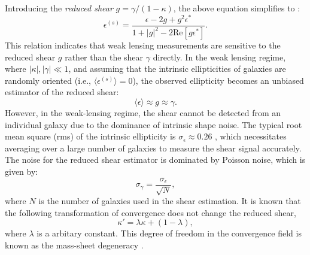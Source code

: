 Introducing the \emph{reduced shear} $g = \gamma / (1 - \kappa)$, the above equation simplifies to \citep{1995A&A...294..411S}:
\begin{equation}
    \epsilon^{(s)} = \frac{\epsilon - 2g + g^2 \epsilon^*}{1 + |g|^2 - 2 \text{Re}[g \epsilon^*]}.
    \label{eq:reduced_shear_ellipticity_g}
\end{equation}
This relation indicates that weak lensing measurements are sensitive to the reduced shear $g$ rather than the shear $\gamma$ directly. In the weak lensing regime, where $|\kappa|, |\gamma| \ll 1$, and assuming that the intrinsic ellipticities of galaxies are randomly oriented (i.e., $\langle \epsilon^{(s)} \rangle = 0$), the observed ellipticity becomes an unbiased estimator of the reduced shear:
\begin{equation}
    \langle \epsilon \rangle \approx g \approx \gamma.
    \label{eq:reduced_shear_expectation}
\end{equation}
However, in the weak-lensing regime, the shear cannot be detected from an individual galaxy due to the dominance of intrinsic shape noise. The typical root mean square (rms) of the intrinsic ellipticity is $\sigma_\epsilon \approx 0.26$ \citep{2019A&A...627A..59E}, which necessitates averaging over a large number of galaxies to measure the shear signal accurately.
The noise for the reduced shear estimator is dominated by Poisson noise, which is given by:
\begin{equation}
    \sigma_\gamma = \frac{\sigma_\epsilon}{\sqrt{N}},
    \label{eq:reduced_shear_noise}
\end{equation}
where $N$ is the number of galaxies used in the shear estimation. It is known that the following transformation of convergence does not change the reduced shear, 
\begin{equation}
    \kappa' = \lambda \kappa + (1 - \lambda),
    \label{eq:kappa_transformation}
\end{equation}
where $\lambda$ is a arbitary constant. This degree of freedom in the convergence
field is known as the mass-sheet degeneracy \citep{1985ApJ...289L...1F}.

